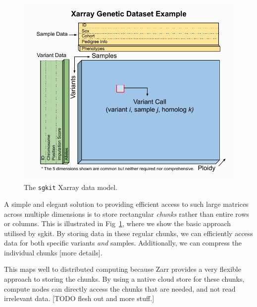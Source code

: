 \documentclass[9pt,lineno]{elife}
\newcommand{\toolname}[1]{\texttt{#1}}
\begin{document}
\begin{figure}
\includegraphics[width=\linewidth]{diagrams/sgkit_xarray_diagram.pdf}
\caption{The \toolname{sgkit} Xarray data model.}
\label{fig-data-layout}
\end{figure}

A simple and elegant solution to providing efficient access to such
large matrices across multiple dimensions is to store rectangular
\emph{chunks} rather than entire rows or columns. This is illustrated
in Fig~\ref{fig-data-layout}, where we show the basic approach
utilised by sgkit. By storing data in these regular chunks, we
can efficiently access data for both specific variants \emph{and}
samples. Additionally, we can compress the individual chunks [more details].

This maps well to distributed computing because Zarr provides a
very flexible approach to storing the chunks. By using a native cloud store
for these chunks, compute nodes can directly access the chunks that
are needed, and not read irrelevant data.
[TODO flesh out and more stuff.]
\end{document}
